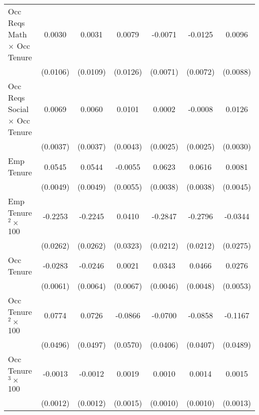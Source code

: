 {\begin{longtable}{l*{6}{c}}
Occ Reqs Math $\times$ Occ Tenure&      0.0030         &      0.0031         &      0.0079         &     -0.0071         &     -0.0125\sym{*}  &      0.0096         \\
                    &    (0.0106)         &    (0.0109)         &    (0.0126)         &    (0.0071)         &    (0.0072)         &    (0.0088)         \\
Occ Reqs Social $\times$ Occ Tenure&      0.0069\sym{*}  &      0.0060         &      0.0101\sym{**} &      0.0002         &     -0.0008         &      0.0126\sym{***}\\
                    &    (0.0037)         &    (0.0037)         &    (0.0043)         &    (0.0025)         &    (0.0025)         &    (0.0030)         \\
Emp Tenure          &      0.0545\sym{***}&      0.0544\sym{***}&     -0.0055         &      0.0623\sym{***}&      0.0616\sym{***}&      0.0081\sym{*}  \\
                    &    (0.0049)         &    (0.0049)         &    (0.0055)         &    (0.0038)         &    (0.0038)         &    (0.0045)         \\
Emp Tenure$^2\times$ 100&     -0.2253\sym{***}&     -0.2245\sym{***}&      0.0410         &     -0.2847\sym{***}&     -0.2796\sym{***}&     -0.0344         \\
                    &    (0.0262)         &    (0.0262)         &    (0.0323)         &    (0.0212)         &    (0.0212)         &    (0.0275)         \\
Occ Tenure          &     -0.0283\sym{***}&     -0.0246\sym{***}&      0.0021         &      0.0343\sym{***}&      0.0466\sym{***}&      0.0276\sym{***}\\
                    &    (0.0061)         &    (0.0064)         &    (0.0067)         &    (0.0046)         &    (0.0048)         &    (0.0053)         \\
Occ Tenure$^2\times$ 100&      0.0774         &      0.0726         &     -0.0866         &     -0.0700\sym{*}  &     -0.0858\sym{**} &     -0.1167\sym{**} \\
                    &    (0.0496)         &    (0.0497)         &    (0.0570)         &    (0.0406)         &    (0.0407)         &    (0.0489)         \\
Occ Tenure$^3\times$ 100&     -0.0013         &     -0.0012         &      0.0019         &      0.0010         &      0.0014         &      0.0015         \\
                    &    (0.0012)         &    (0.0012)         &    (0.0015)         &    (0.0010)         &    (0.0010)         &    (0.0013)         \\

\end{longtable}}
